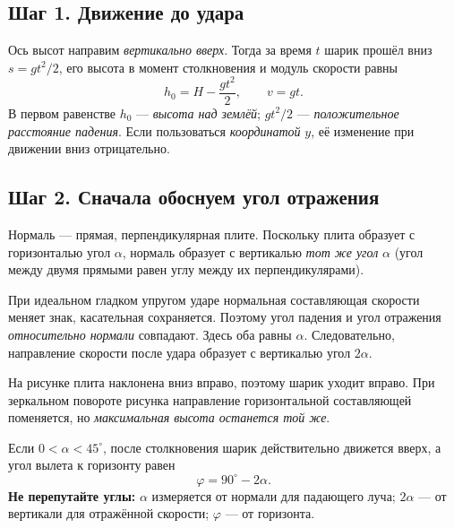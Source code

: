 \documentclass[a4paper,12pt]{article}
\newcommand{\key}[1]{\textcolor{darkaccent}{\textbf{#1}}}
\newcommand{\vect}[1]{\vec{#1}}
\newcommand{\smallhead}[1]{\subsection*{\textcolor{darkaccent}{#1}}}
\begin{document}
\smallhead{Шаг 1. Движение до удара}
Ось высот направим \emph{вертикально вверх}. Тогда за время \(t\) шарик прошёл вниз \(s=gt^2/2\), его высота в момент столкновения и модуль скорости равны
\[
\boxed{h_0=H-\frac{gt^2}{2}},\qquad \boxed{v=gt}.
\]
В первом равенстве \(h_0\) --- \emph{высота над землёй}; \(gt^2/2\) --- \emph{положительное расстояние падения}. Если пользоваться \emph{координатой} \(y\), её изменение при движении вниз отрицательно.

\smallhead{Шаг 2. Сначала обоснуем угол отражения}
Нормаль --- прямая, перпендикулярная плите. Поскольку плита образует с горизонталью угол \(\alpha\), нормаль образует с вертикалью \emph{тот же угол} \(\alpha\) (угол между двумя прямыми равен углу между их перпендикулярами).

При идеальном гладком упругом ударе нормальная составляющая скорости меняет знак, касательная сохраняется. Поэтому угол падения и угол отражения \emph{относительно нормали} совпадают. Здесь оба равны \(\alpha\). Следовательно, направление скорости после удара образует с вертикалью угол \(2\alpha\).

\begin{center}
\end{center}
На рисунке плита наклонена вниз вправо, поэтому шарик уходит вправо. При зеркальном повороте рисунка направление горизонтальной составляющей поменяется, но \emph{максимальная высота останется той же}.

Если \(0<\alpha<45^\circ\), после столкновения шарик действительно движется вверх, а угол вылета к горизонту равен
\[
\boxed{\varphi=90^\circ-2\alpha.}
\]
\key{Не перепутайте углы:} \(\alpha\) измеряется от нормали для падающего луча; \(2\alpha\) --- от вертикали для отражённой скорости; \(\varphi\) --- от горизонта.
\end{document}
